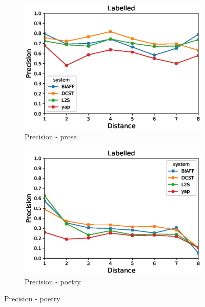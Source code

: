 \documentclass[11pt]{article}
\begin{document}
\begin{figure}[!ht]
        \centering
        \begin{subfigure}[b]{0.475\textwidth}
            \centering
            \includegraphics[width=\textwidth]{images/proseLabelledPrecisionDistRoot.eps}
            \caption[Network2]%
            {{\small Precision - prose}}    
            
        \end{subfigure}
        \hfill
        \begin{subfigure}[b]{0.475\textwidth}  
            \centering 
            \includegraphics[width=\textwidth]{images/poetryLabelledPrecisionDistRoot.eps}
            \caption[]%
            {{\small Precision - poetry}}    
            

\end{subfigure}
\end{figure}
\end{document}
